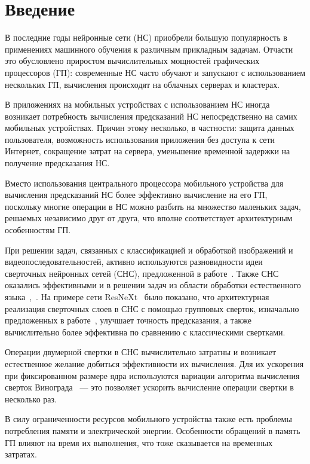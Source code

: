 \section{Введение} 

В последние годы нейронные сети (НС) приобрели большую популярность в
применениях машинного обучения к различным прикладным задачам. Отчасти это
обусловлено приростом вычислительных мощностей графических процессоров (ГП):
современные НС часто обучают и запускают с использованием нескольких ГП,
вычисления происходят на облачных серверах и кластерах.

В приложениях на мобильных устройствах с использованием НС иногда возникает
потребность вычисления предсказаний НС непосредственно на самих мобильных
устройствах. Причин этому несколько, в частности: защита данных пользователя,
возможность использования приложения без доступа к сети Интернет, сокращение
затрат на сервера, уменьшение временной задержки на получение предсказания НС. 

Вместо использования центрального процессора мобильного устройства для
вычисления предсказаний НС более эффективно вычисление на его ГП, поскольку
многие операции в НС можно разбить на множество маленьких задач, решаемых
независимо друг от друга, что вполне соответствует архитектурным особенностям
ГП.  

При решении задач, связанных с классификацией и обработкой изображений и
видеопоследовательностей, активно используются разновидности идеи сверточных
нейронных сетей (СНС), предложенной в работе~\cite{cnn}. Также СНС оказались
эффективными и в решении задач из области обработки естественного
языка~\cite{conv_nlp},~\cite{cnn_text_class}. На примере сети
ResNeXt~\cite{resnext} было показано, что архитектурная реализация сверточных
слоев в СНС с помощью групповых сверток, изначально предложенных в
работе~\cite{alexnet}, улучшает точность предсказания, а также вычислительно
более эффективна по сравнению с классическими свертками.

Операции двумерной свертки в СНС вычислительно затратны и возникает естественное
желание добиться эффективности их вычисления. Для их ускорения при фиксированном
размере ядра используются вариации алгоритма вычисления сверток
Винограда~\cite{winograd1980arithmetic} — это позволяет ускорить вычисление
операции свертки в несколько раз.

В силу ограниченности ресурсов мобильного устройства также есть проблемы
потребления памяти и электрической энергии. Особенности обращений в память ГП
влияют на время их выполнения, что тоже сказывается на временных затратах.

